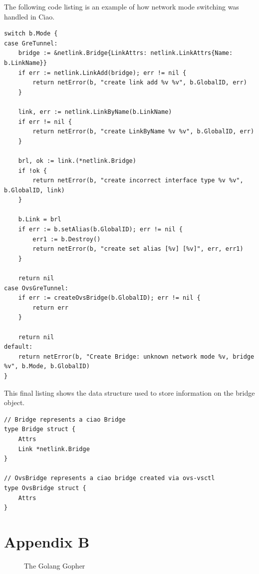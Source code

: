 \documentclass[10pt,onecolumn,journal,draftclsnofoot]{IEEEtran}
\begin{document}
The following code listing is an example of how network mode switching was handled in Ciao.

\begin{lstlisting}[caption=Network mode switching]
switch b.Mode {
case GreTunnel:
	bridge := &netlink.Bridge{LinkAttrs: netlink.LinkAttrs{Name: b.LinkName}}
	if err := netlink.LinkAdd(bridge); err != nil {
		return netError(b, "create link add %v %v", b.GlobalID, err)
	}
	
	link, err := netlink.LinkByName(b.LinkName)
	if err != nil {
		return netError(b, "create LinkByName %v %v", b.GlobalID, err)
	}
	
	brl, ok := link.(*netlink.Bridge)
	if !ok {
		return netError(b, "create incorrect interface type %v %v", b.GlobalID, link)
	}
	
	b.Link = brl
	if err := b.setAlias(b.GlobalID); err != nil {
		err1 := b.Destroy()
		return netError(b, "create set alias [%v] [%v]", err, err1)
	}
	
	return nil
case OvsGreTunnel:
	if err := createOvsBridge(b.GlobalID); err != nil {
		return err
	}
	
	return nil
default:
	return netError(b, "Create Bridge: unknown network mode %v, bridge %v", b.Mode, b.GlobalID)
}

\end{lstlisting}

This final listing shows the data structure used to store information on the bridge object.

\begin{lstlisting}[caption=Ciao bridge object and supplementary OvsBridge object]
// Bridge represents a ciao Bridge
type Bridge struct {
	Attrs
	Link *netlink.Bridge
}

// OvsBridge represents a ciao bridge created via ovs-vsctl
type OvsBridge struct {
	Attrs
}
\end{lstlisting}


\section{Appendix B}
\begin{figure}[H]
\caption{The Golang Gopher}
\end{figure}
\end{document}
